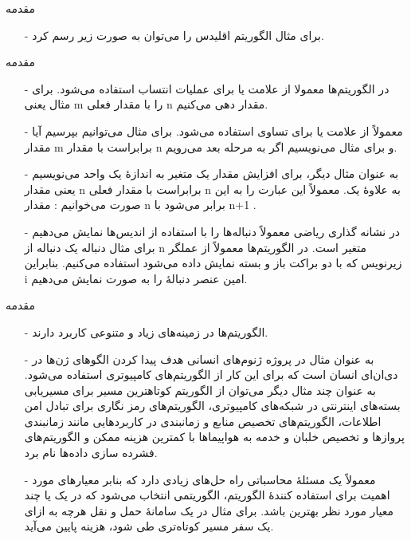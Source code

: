 \begin{frame}{مقدمه}
\begin{itemize}\itemr
\item[-]
برای مثال الگوریتم اقلیدس را می‌توان به صورت زیر رسم کرد.
\begin{figure}[h]

\end{figure}
\end{itemize}
\end{frame}


\begin{frame}{مقدمه}
\begin{itemize}\itemr
\item[-]
در الگوریتم‌ها معمولا از علامت
\m{\leftarrow}
یا
\m{:=}
برای عملیات انتساب استفاده می‌شود. برای مثال
یعنی
m
را با مقدار فعلی
n
مقدار دهی می‌کنیم.
\item[-]
معمولاً از علامت
\m{=}
یا
\m{==}
برای تساوی استفاده می‌شود. برای مثال می‌توانیم بپرسیم آیا مقدار
m
برابراست با مقدار
n
و برای مثال می‌نویسیم اگر
به مرحله بعد می‌رویم.
\item[-]
به عنوان مثال دیگر، برای افزایش مقدار یک متغیر به اندازهٔ یک واحد می‌نویسیم
یعنی مقدار
n
برابراست با مقدار فعلی
n
به علاوهٔ یک. معمولاً این عبارت را به این صورت می‌خوانیم : مقدار
n
برابر می‌شود با
n+1
.
\item[-]
در نشانه گذاری ریاضی معمولاً دنباله‌ها را با استفاده از اندیس‌ها نمایش می‌دهیم برای مثال دنباله
یک دنباله از
n
متغیر است. در الگوریتم‌ها معمولاً از عملگر زیرنویس
که با دو براکت باز و بسته
\m{[~]}
نمایش داده می‌شود استفاده می‌کنیم. بنابراین
i
امین عنصر دنبالهٔ
را به صورت
نمایش می‌دهیم.
\end{itemize}
\end{frame}


\begin{frame}{مقدمه}
\begin{itemize}\itemr
\item[-]
الگوریتم‌ها در زمینه‌های زیاد و متنوعی کاربرد دارند.
\item[-]
به عنوان مثال در پروژه ژنوم‌های انسانی هدف پیدا کردن الگوهای ژن‌ها در دی‌ان‌ای
 انسان است که برای این کار از الگوریتم‌های کامپیوتری استفاده می‌شود. به عنوان چند مثال دیگر می‌توان از الگوریتم کوتاهترین مسیر برای مسیریابی بسته‌های اینترنتی در شبکه‌های کامپیوتری، الگوریتم‌های رمز نگاری برای تبادل امن اطلاعات، الگوریتم‌های تخصیص منابع و زمانبندی در کاربردهایی مانند زمانبندی پروازها و تخصیص خلبان و خدمه به هواپیماها با کمترین هزینه ممکن و الگوریتم‌های فشرده سازی داده‌ها نام برد.
\item[-]
معمولاً یک مسئلهٔ محاسباتی راه حل‌های زیادی دارد که بنابر معیارهای مورد اهمیت برای استفاده کنندهٔ الگوریتم، الگوریتمی انتخاب می‌شود که در یک یا چند معیار مورد نظر بهترین باشد. برای مثال در یک سامانهٔ حمل و نقل هرچه به ازای یک سفر مسیر کوتاه‌تری طی شود، هزینه پایین می‌آید.
\end{itemize}
\end{frame}


